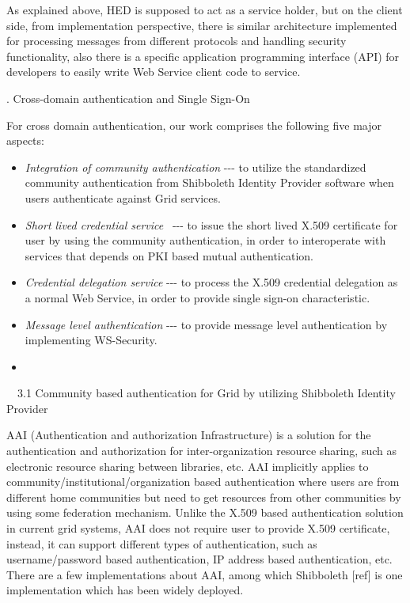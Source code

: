 \documentclass{article}
\newcommand\liststyleLiii{%
\renewcommand\labelitemi{${\bullet}$}
\renewcommand\labelitemii{${\circ}$}
\renewcommand\labelitemiii{${\blacksquare}$}
\renewcommand\labelitemiv{${\bullet}$}
}
\begin{document}
As explained above, HED is supposed to act as a service holder, but on
the client side, from implementation perspective, there is similar
architecture implemented for processing messages from different
protocols and handling security functionality, also there is a specific
application programming interface (API) for developers to easily write
Web Service client code to service.


\bigskip

{. Cross-domain authentication and Single Sign-On
\par}

For cross domain authentication, our work comprises the following five
major aspects:

\liststyleLiii
\begin{itemize}
\item \textit{Integration of community authentication} -{}-{}- to
utilize the standardized community authentication from Shibboleth
Identity Provider software when users authenticate against Grid
services.
\item \textit{Short lived credential service} \ {}-{}-{}- to issue the
short lived X.509 certificate for user by using the community
authentication, in order to interoperate with services that depends on
PKI based mutual authentication.
\item \textit{Credential delegation service} -{}-{}- to process the
X.509 credential delegation as a normal Web Service, in order to
provide single sign-on characteristic.
\item \textit{Message level authentication} -{}-{}- to provide message
level authentication by implementing WS-Security.
\item 
\bigskip
\end{itemize}

\bigskip

\ \ 3.1 Community based authentication for Grid by utilizing Shibboleth
Identity Provider

AAI (Authentication and authorization Infrastructure) is a solution for
the authentication and authorization for inter-organization resource
sharing, such as electronic resource sharing between libraries, etc.
AAI implicitly applies to community/institutional/organization based
authentication where users are from different home communities but need
to get resources from other communities by using some federation
mechanism. Unlike the X.509 based authentication solution in current
grid systems, AAI does not require user to provide X.509 certificate,
instead, it can support different types of authentication, such as
username/password based authentication, IP address based
authentication, etc. There are a few implementations about AAI, among
which Shibboleth [ref] is one implementation which has been widely
deployed.
\end{document}
